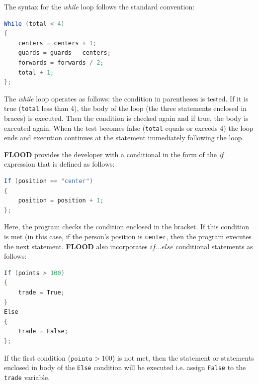 \documentclass[12pt]{report}
\begin{document}
The syntax for the \textit{while} loop follows the standard convention:

\begin{singlespace}
\begin{lstlisting}[language=Java,label=some-code,caption={\textit{while} loop}]
While (total < 4)
{
	centers = centers + 1;
	guards = guards - centers;
	forwards = forwards / 2;
	total + 1;
};
\end{lstlisting}
\end{singlespace}

The \textit{while} loop operates as follows: the condition in parentheses is tested. If it is true (\texttt{total} less than 4), the body of the loop (the three statements enclosed in braces) is executed. Then the condition is checked again and if true, the body is executed again. When the test becomes false (\texttt{total} equals or exceeds 4) the loop ends and execution continues at the statement immediately following the loop. 

\textbf{FLOOD} provides the developer with a conditional in the form of the \textit{if} expression that is defined as follows:

\begin{singlespace}
\begin{lstlisting}[language=Java,label=some-code,caption={\textit{If} conditional}]
If (position == "center")
{
	position = position + 1;
};
\end{lstlisting}
\end{singlespace}

Here, the program checks the condition enclosed in the bracket. If this condition is met (in this case, if the person's position is \texttt{center}, then the program executes the next statement. \textbf{FLOOD} also incorporates \textit{$if\ldots else$} conditional statements as follows:

\begin{singlespace}
\begin{lstlisting}[language=Java,label=some-code,caption={\textit{If\ldots Else} conditional statement.}]
If (points > 100)
{
	trade = True;
}
Else
{
	trade = False;
};	
\end{lstlisting}
\end{singlespace}

If the first condition ($\texttt{points} > 100$) is not met, then the statement or statements enclosed in body of the \texttt{Else} condition will be executed i.e. assign \texttt{False} to the \texttt{trade} variable.
\end{document}

